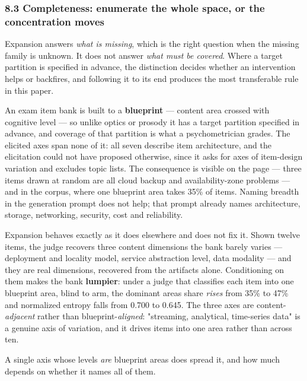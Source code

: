 \documentclass[
  10pt,
]{article}
\theoremstyle{plain}
\theoremstyle{definition}
\begin{document}
\subsubsection{8.3 Completeness: enumerate the whole space, or the
concentration
moves}\label{83-completeness-enumerate-the-whole-space-or-the-concentration-moves}

Expansion answers \emph{what is missing}, which is the right question
when the missing family is unknown. It does not answer \emph{what must
be covered}. Where a target partition is specified in advance, the
distinction decides whether an intervention helps or backfires, and
following it to its end produces the most transferable rule in this
paper.

An exam item bank is built to a \textbf{blueprint} --- content area
crossed with cognitive level --- so unlike optics or prosody it has a
target partition specified in advance, and coverage of that partition is
what a psychometrician grades. The elicited axes span none of it: all
seven describe item architecture, and the elicitation could not have
proposed otherwise, since it asks for axes of item-design variation and
excludes topic lists. The consequence is visible on the page --- three
items drawn at random are all cloud backup and availability-zone
problems --- and in the corpus, where one blueprint area takes 35\% of
items. Naming breadth in the generation prompt does not help; that
prompt already names architecture, storage, networking, security, cost
and reliability.

Expansion behaves exactly as it does elsewhere and does not fix it.
Shown twelve items, the judge recovers three content dimensions the bank
barely varies --- deployment and locality model, service abstraction
level, data modality --- and they are real dimensions, recovered from
the artifacts alone. Conditioning on them makes the bank
\textbf{lumpier}: under a judge that classifies each item into one
blueprint area, blind to arm, the dominant area\textquotesingle s share
\emph{rises} from 35\% to 47\% and normalized entropy falls from 0.700
to 0.645. The three axes are content-\emph{adjacent} rather than
blueprint-\emph{aligned}: "streaming, analytical, time-series data" is a
genuine axis of variation, and it drives items into one area rather than
across ten.

A single axis whose levels \emph{are} blueprint areas does spread it,
and how much depends on whether it names all of them.
\end{document}
